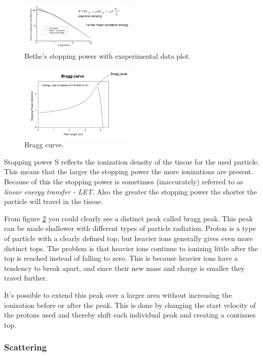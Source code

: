 \documentclass[jmp, amsmath, amssymb, reprint]{article}
\numberwithin{equation}{section}
\begin{document}
\begin{multicols}{2}
\begin{figure}[H]
	\centering
  	\includegraphics[width=0.50\textwidth]{bethe_energy.png}
	\caption{Bethe's stopping power with exsperimental data plot.}
	\label{fig:bethes_energy}
\end{figure}

\begin{figure}[H]
	\centering
  	\includegraphics[width=0.50\textwidth]{bragg.png}
	\caption{Bragg curve.}
	\label{fig:bragg}
\end{figure}

Stopping power S reflects the ionization density of the tissue for the used particle. This means that the larger the stopping power the more ionizations are present. Because of this the stopping power is sometimes (inaccurately) referred to as \textit{linear energy transfer - LET}. Also the greater the stopping power the shorter the particle will travel in the tissue.

From figure \ref{fig:bragg} you could clearly see a distinct peak called bragg peak. This peak can be made shallower with different types of particle radiation. Proton is a type of particle with a clearly defined top, but heavier ions generally gives even more distinct tops. The problem is that heavier ions continue to ionizing little after the top is reached instead of falling to zero. This is because heavier ions have a tendency to break apart, and since their new mass and charge is smaller they travel further.

It's possible to extend this peak over a larger area without increasing the ionization before or after the peak. This is done by changing the start velocity of the protons used and thereby shift each individual peak and creating a continues top.


\subsubsection{Scattering}


\end{multicols}
\end{document}
